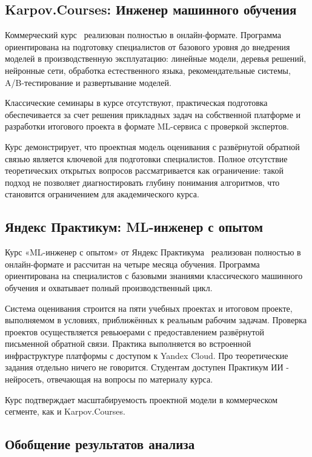 \subsection{Karpov.Courses: Инженер машинного обучения}

Коммерческий курс~\cite{karpov_ml} реализован полностью в онлайн-формате. Программа ориентирована на подготовку специалистов от базового уровня до внедрения моделей в производственную эксплуатацию: линейные модели, деревья решений, нейронные сети, обработка естественного языка, рекомендательные системы, A/B-тестирование и развертывание моделей.

Классические семинары в курсе отсутствуют, практическая подготовка обеспечивается за счет решения прикладных задач на собственной платформе и разработки итогового проекта в формате ML-сервиса с проверкой экспертов.

Курс демонстрирует, что проектная модель оценивания с развёрнутой обратной
связью является ключевой для подготовки специалистов. 
Полное отсутствие теоретических открытых вопросов рассматривается как
ограничение: такой подход не позволяет диагностировать глубину понимания
алгоритмов, что становится ограничением для академического курса. 

\subsection{Яндекс Практикум: ML-инженер с опытом}

Курс «ML-инженер с опытом» от Яндекс Практикума~\cite{yandex_practicum_ml} реализован полностью в онлайн-формате и рассчитан на четыре месяца обучения. Программа ориентирована на специалистов с базовыми знаниями классического машинного обучения и охватывает полный производственный цикл. 

Система оценивания строится на пяти учебных проектах и итоговом проекте, выполняемом в условиях, приближённых к реальным рабочим задачам. Проверка проектов осуществляется ревьюерами с предоставлением развёрнутой письменной обратной связи. Практика выполняется во встроенной инфраструктуре платформы с доступом к Yandex Cloud. Про теоретические задания отдельно ничего не говорится. Студентам доступен Практикум ИИ - нейросеть, отвечающая на вопросы по материалу курса.

Курс подтверждает масштабируемость проектной модели в коммерческом сегменте, как и Karpov.Courses. 

\subsection{Обобщение результатов анализа}\label{sec:results_course_analysis}


